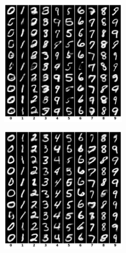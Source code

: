 \begin{figure}[ht]
    \centering
    \begin{subfigure}{0.45\textwidth}
        \centering
        \includegraphics[width=0.7\textwidth]{Figures/Methods/RKM-congen-ubMNIST.png}
    \end{subfigure}
    \hfill
    \begin{subfigure}{0.45\textwidth}
        \centering
        \includegraphics[width=0.7\textwidth]{Figures/Methods/IWRKM-congen-ubMNIST.png}
    \end{subfigure}
    \hfill
    \begin{subfigure}{0.45\textwidth}
        \centering

\end{subfigure}
\end{figure}
